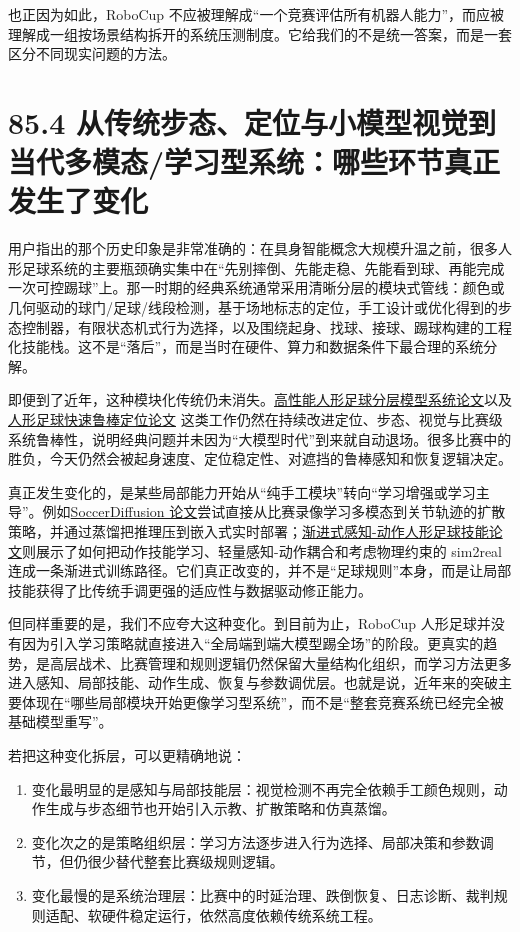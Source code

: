 也正因为如此，RoboCup 不应被理解成“一个竞赛评估所有机器人能力”，而应被理解成一组按场景结构拆开的系统压测制度。它给我们的不是统一答案，而是一套区分不同现实问题的方法。

\section*{85.4 从传统步态、定位与小模型视觉到当代多模态/学习型系统：哪些环节真正发生了变化}


用户指出的那个历史印象是非常准确的：在具身智能概念大规模升温之前，很多人形足球系统的主要瓶颈确实集中在“先别摔倒、先能走稳、先能看到球、再能完成一次可控踢球”上。那一时期的经典系统通常采用清晰分层的模块式管线：颜色或几何驱动的球门/足球/线段检测，基于场地标志的定位，手工设计或优化得到的步态控制器，有限状态机式行为选择，以及围绕起身、找球、接球、踢球构建的工程化技能栈。这不是“落后”，而是当时在硬件、算力和数据条件下最合理的系统分解。

即便到了近年，这种模块化传统仍未消失。\href{https://arxiv.org/abs/2512.09431}{高性能人形足球分层模型系统论文}以及\href{https://arxiv.org/abs/2503.11020}{人形足球快速鲁棒定位论文} 这类工作仍然在持续改进定位、步态、视觉与比赛级系统鲁棒性，说明经典问题并未因为“大模型时代”到来就自动退场。很多比赛中的胜负，今天仍然会被起身速度、定位稳定性、对遮挡的鲁棒感知和恢复逻辑决定。

真正发生变化的，是某些局部能力开始从“纯手工模块”转向“学习增强或学习主导”。例如\href{https://arxiv.org/abs/2504.20808}{SoccerDiffusion 论文}尝试直接从比赛录像学习多模态到关节轨迹的扩散策略，并通过蒸馏把推理压到嵌入式实时部署；\href{https://arxiv.org/abs/2602.05310}{渐进式感知-动作人形足球技能论文}则展示了如何把动作技能学习、轻量感知-动作耦合和考虑物理约束的 sim2real 连成一条渐进式训练路径。它们真正改变的，并不是“足球规则”本身，而是让局部技能获得了比传统手调更强的适应性与数据驱动修正能力。

但同样重要的是，我们不应夸大这种变化。到目前为止，RoboCup 人形足球并没有因为引入学习策略就直接进入“全局端到端大模型踢全场”的阶段。更真实的趋势，是高层战术、比赛管理和规则逻辑仍然保留大量结构化组织，而学习方法更多进入感知、局部技能、动作生成、恢复与参数调优层。也就是说，近年来的突破主要体现在“哪些局部模块开始更像学习型系统”，而不是“整套竞赛系统已经完全被基础模型重写”。

若把这种变化拆层，可以更精确地说：

\begin{enumerate}
\item 变化最明显的是感知与局部技能层：视觉检测不再完全依赖手工颜色规则，动作生成与步态细节也开始引入示教、扩散策略和仿真蒸馏。
\item 变化次之的是策略组织层：学习方法逐步进入行为选择、局部决策和参数调节，但仍很少替代整套比赛级规则逻辑。
\item 变化最慢的是系统治理层：比赛中的时延治理、跌倒恢复、日志诊断、裁判规则适配、软硬件稳定运行，依然高度依赖传统系统工程。
\end{enumerate}

